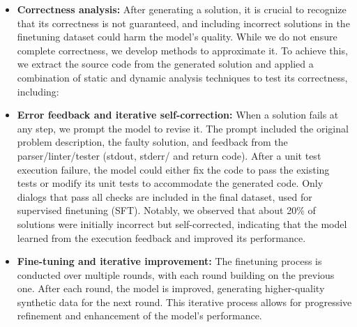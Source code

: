 \begin{enumerate}
\begin{itemize}
        \item \textbf{Correctness analysis:}
        After generating a solution, it is crucial to recognize that its correctness is not guaranteed, and including incorrect solutions in the finetuning dataset could harm the model's quality. While we do not ensure complete correctness, we develop methods to approximate it. To achieve this, we extract the source code from the generated solution and applied a combination of static and dynamic analysis techniques to test its correctness, including:
        
        
        \item \textbf{Error feedback and iterative self-correction:}
        When a solution fails at any step, we prompt the model to revise it. The prompt included the original problem description, the faulty solution, and feedback from the parser/linter/tester (stdout, stderr/ and return code). %
        After a unit test execution failure, the model could either fix the code to pass the existing tests or modify its unit tests to accommodate the generated code.
        Only dialogs that pass all checks are included in the final dataset, used for supervised finetuning (SFT). Notably, we observed that about 20\% of solutions were initially incorrect but self-corrected, indicating that the model learned from the execution feedback and improved its performance.
        
        \item \textbf{Fine-tuning and iterative improvement:} The finetuning process is conducted over multiple rounds, with each round building on the previous one. After each round, the model is improved, generating higher-quality synthetic data for the next round. This iterative process allows for progressive refinement and enhancement of the model's performance.
    \end{itemize}


\end{enumerate}
